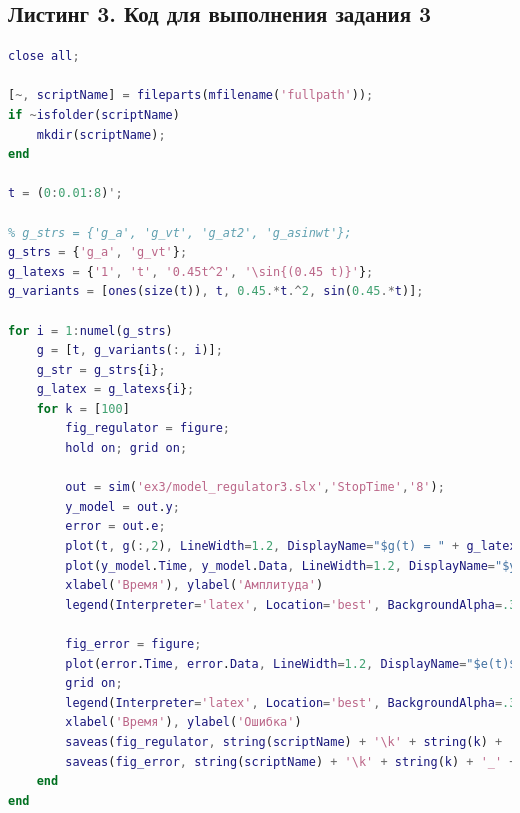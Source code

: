 \documentclass[a4paper]{article}
\begin{document}
\subsection*{Листинг 3. Код для выполнения задания 3}
\begin{lstlisting}[caption={Код для построения графиков для задания 3}, language=matlab]
% clear all;
close all;

[~, scriptName] = fileparts(mfilename('fullpath'));
if ~isfolder(scriptName)
    mkdir(scriptName);
end

t = (0:0.01:8)';

% g_strs = {'g_a', 'g_vt', 'g_at2', 'g_asinwt'};
g_strs = {'g_a', 'g_vt'};
g_latexs = {'1', 't', '0.45t^2', '\sin{(0.45 t)}'};
g_variants = [ones(size(t)), t, 0.45.*t.^2, sin(0.45.*t)];

for i = 1:numel(g_strs)
    g = [t, g_variants(:, i)];
    g_str = g_strs{i};
    g_latex = g_latexs{i};
    for k = [100]
        fig_regulator = figure;
        hold on; grid on;

        out = sim('ex3/model_regulator3.slx','StopTime','8');
        y_model = out.y;
        error = out.e;
        plot(t, g(:,2), LineWidth=1.2, DisplayName="$g(t) = " + g_latex + "$")
        plot(y_model.Time, y_model.Data, LineWidth=1.2, DisplayName="$y_{zamk}(t), k = " + string(k) + "$")
        xlabel('Время'), ylabel('Амплитуда')
        legend(Interpreter='latex', Location='best', BackgroundAlpha=.3, FontSize=12, FontName='Computer Modern')

        fig_error = figure;
        plot(error.Time, error.Data, LineWidth=1.2, DisplayName="$e(t)$")
        grid on;
        legend(Interpreter='latex', Location='best', BackgroundAlpha=.3, FontSize=12, FontName='Computer Modern')
        xlabel('Время'), ylabel('Ошибка')
        saveas(fig_regulator, string(scriptName) + '\k' + string(k) + '_' + g_str + '.eps', 'epsc')
        saveas(fig_error, string(scriptName) + '\k' + string(k) + '_' + g_str + '_error.eps', 'epsc')
    end
end
\end{lstlisting}
\end{document}

